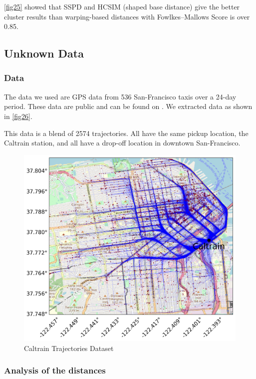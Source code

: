 \documentclass[a4paper, 12pt]{article}
\begin{document}
\pagebreak

\autoref{fig25} showed that SSPD and HCSIM (shaped base distance) give the better cluster results than warping-based distances with Fowlkes–Mallows Score is over 0.85.

\subsection{Unknown Data}

\subsubsection{Data}
The data we used are GPS data from 536 San-Francisco taxis over a 24-day period. These data are public and can be found on \cite{piorkowski2009crawdad}. We extracted data as shown in \autoref{fig26}.

This data is a blend of 2574 trajectories. All have the same pickup location, the Caltrain station, and all have a drop-off location in downtown San-Francisco.

\begin{figure}[ht]
    \centering
    \includegraphics[width=1\textwidth]{caltrain_trajectory_map.png}
    \caption{Caltrain Trajectories Dataset}
    \label{fig26}
\end{figure}

\subsubsection{Analysis of the distances}
\end{document}
